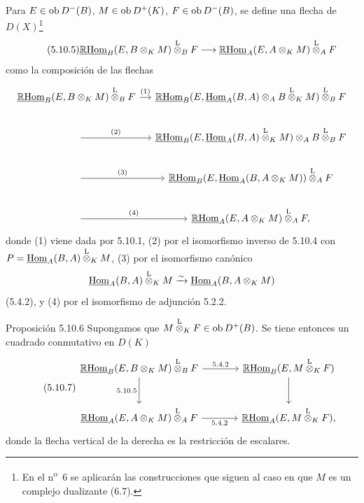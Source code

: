 Para $E\in\operatorname{ob} D^-(B)$, $M\in\operatorname{ob} D^+(K)$, $F\in\operatorname{ob} D^-(B)$, se define una flecha de $D(X)$\footnote{En el n\textsuperscript{o}~6 se aplicarán las construcciones que siguen al caso en que $M$ es un complejo dualizante (6.7).}
\begin{equation}\tag{5.10.5}
\underline{\mathbb{R}\mathrm{Hom}}_B(E,B\otimes_KM)\overset{\mathrm L}{\otimes}_BF\longrightarrow\underline{\mathbb{R}\mathrm{Hom}}_A(E,A\otimes_KM)\overset{\mathrm L}{\otimes}_AF
\end{equation}
como la composición de las flechas
\[
\begin{tikzcd}[column sep=small]
\uRHom_B(E,B\otimes_KM)\lten_BF \arrow[r,"(1)"] & \uRHom_B(E,\uHom_A(B,A)\otimes_AB\lten_KM)\lten_BF \\
\arrow[r,"(2)"] & \uRHom_B(E,\uHom_A(B,A)\lten_KM)\otimes_A B\lten_BF \\
\arrow[r,"(3)"] & \uRHom_B(E,\uHom_A(B,A\otimes_KM))\lten_AF \\
\arrow[r,"(4)"] & \uRHom_A(E,A\otimes_KM)\lten_AF,
\end{tikzcd}
\]
donde (1) viene dada por 5.10.1, (2) por el isomorfismo inverso de 5.10.4 con $P=\underline{\operatorname{Hom}}_A(B,A)\overset{\mathrm L}{\otimes}_KM$, (3) por el isomorfismo canónico
\[
\underline{\operatorname{Hom}}_A(B,A)\overset{\mathrm L}{\otimes}_KM\xrightarrow{\sim}\underline{\operatorname{Hom}}_A(B,A\otimes_KM)
\]
(5.4.2), y (4) por el isomorfismo de adjunción 5.2.2.

\begin{statement}{Proposición 5.10.6}
Supongamos que $M\overset{\mathrm L}{\otimes}_KF\in\operatorname{ob} D^+(B)$. Se tiene entonces un cuadrado conmutativo en $D(K)$
\begin{equation}\tag{5.10.7}
\begin{tikzcd}[column sep=large,row sep=large]
\uRHom_B(E,B\otimes_KM)\lten_BF \arrow[r,"5.4.2"] \arrow[d,"5.10.5"'] & \uRHom_B(E,M\lten_KF) \arrow[d]\\
\uRHom_A(E,A\otimes_KM)\lten_AF \arrow[r,"5.4.2"'] & \uRHom_A(E,M\lten_KF),
\end{tikzcd}
\end{equation}
donde la flecha vertical de la derecha es la restricción de escalares.
\end{statement}

